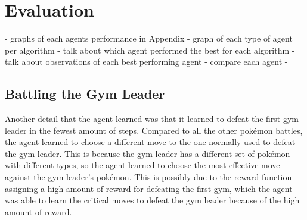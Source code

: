 \section{Evaluation}

- graphs of each agents performance in Appendix
- graph of each type of agent per algorithm
- talk about which agent performed the best for each algorithm
- talk about observations of each best performing agent 
- compare each agent 
- 

\subsection{Battling the Gym Leader}

Another detail that the agent learned was that it learned to defeat the first gym leader in the fewest amount of steps. Compared to all the other pokémon battles, the agent learned to choose a different move to the one normally used to defeat the gym leader. This is because the gym leader has a different set of pokémon with different types, so the agent learned to choose the most effective move against the gym leader's pokémon. This is possibly due to the reward function assigning a high amount of reward for defeating the first gym, which the agent was able to learn the critical moves to defeat the gym leader because of the high amount of reward. 

